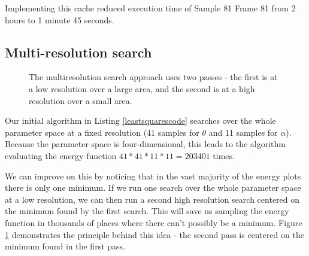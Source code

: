 Implementing this cache reduced execution time of Sample 81 Frame 81 from 2 hours to 1 minute 45 seconds.

\subsection{Multi-resolution search}

\begin{figure}[tb]
	\centering
	\qquad
	\caption{The multiresolution search approach uses two passes - the first is at a low resolution over a large area,
		and the second is at a high resolution over a small area.}
	\label{MultiResImages}
\end{figure}

Our initial algorithm in Listing \ref{leastsquarescode} searches over the whole parameter space at a fixed resolution (41 samples for $\theta$ and 11 samples for $\alpha$).
Because the parameter space is four-dimensional, this leads to the algorithm evaluating the energy function $41*41*11*11 = 203401$ times.

We can improve on this by noticing that in the vast majority of the energy plots there is only one minimum.
If we run one search over the whole parameter space at a low resolution, we can then run a second high resolution search centered on the minimum found by the first search.
This will save us sampling the energy function in thousands of places where there can't possibly be a minimum.
Figure \ref{MultiResImages} demonstrates the principle behind this idea - the second pass is centered on the minimum found in the first pass.

